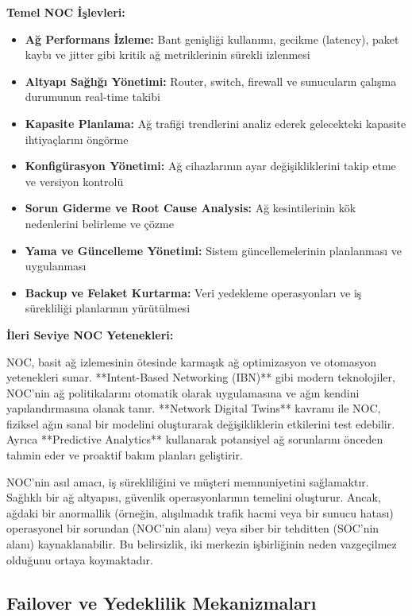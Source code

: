 \textbf{Temel NOC İşlevleri:}
\begin{itemize}
    \item \textbf{Ağ Performans İzleme:} Bant genişliği kullanımı, gecikme (latency), paket kaybı ve jitter gibi kritik ağ metriklerinin sürekli izlenmesi
    \item \textbf{Altyapı Sağlığı Yönetimi:} Router, switch, firewall ve sunucuların çalışma durumunun real-time takibi
    \item \textbf{Kapasite Planlama:} Ağ trafiği trendlerini analiz ederek gelecekteki kapasite ihtiyaçlarını öngörme
    \item \textbf{Konfigürasyon Yönetimi:} Ağ cihazlarının ayar değişikliklerini takip etme ve versiyon kontrolü
    \item \textbf{Sorun Giderme ve Root Cause Analysis:} Ağ kesintilerinin kök nedenlerini belirleme ve çözme
    \item \textbf{Yama ve Güncelleme Yönetimi:} Sistem güncellemelerinin planlanması ve uygulanması
    \item \textbf{Backup ve Felaket Kurtarma:} Veri yedekleme operasyonları ve iş sürekliliği planlarının yürütülmesi
\end{itemize}

\textbf{İleri Seviye NOC Yetenekleri:}

NOC, basit ağ izlemesinin ötesinde karmaşık ağ optimizasyon ve otomasyon yetenekleri sunar. **Intent-Based Networking (IBN)** gibi modern teknolojiler, NOC'nin ağ politikalarını otomatik olarak uygulamasına ve ağın kendini yapılandırmasına olanak tanır. **Network Digital Twins** kavramı ile NOC, fiziksel ağın sanal bir modelini oluşturarak değişikliklerin etkilerini test edebilir. Ayrıca **Predictive Analytics** kullanarak potansiyel ağ sorunlarını önceden tahmin eder ve proaktif bakım planları geliştirir.

NOC'nin asıl amacı, iş sürekliliğini ve müşteri memnuniyetini sağlamaktır. Sağlıklı bir ağ altyapısı, güvenlik operasyonlarının temelini oluşturur. Ancak, ağdaki bir anormallik (örneğin, alışılmadık trafik hacmi veya bir sunucu hatası) operasyonel bir sorundan (NOC'nin alanı) veya siber bir tehditten (SOC'nin alanı) kaynaklanabilir. Bu belirsizlik, iki merkezin işbirliğinin neden vazgeçilmez olduğunu ortaya koymaktadır.

\subsection{Failover ve Yedeklilik Mekanizmaları}

